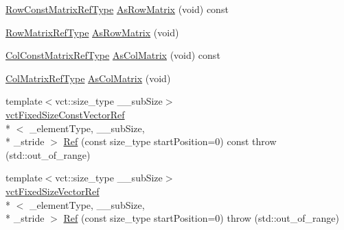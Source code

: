 {\bf }\par
\begin{DoxyCompactItemize}
\item 
\hyperlink{classvct_fixed_size_const_vector_base_ab7c118dbf79db9194157ced0e4549814}{Row\-Const\-Matrix\-Ref\-Type} \hyperlink{classvct_fixed_size_vector_base_a39464b3784e6b405902fd2a9fc76dbbb}{As\-Row\-Matrix} (void) const 
\item 
\hyperlink{classvct_fixed_size_const_vector_base_a1f9ff7c6b2b3f98c51d1bf3eefdfbd32}{Row\-Matrix\-Ref\-Type} \hyperlink{classvct_fixed_size_vector_base_af441b67e4a887c3d32b8ac4aa764a1e6}{As\-Row\-Matrix} (void)
\item 
\hyperlink{classvct_fixed_size_const_vector_base_a7dd213f3b90969b8c89fd0766cf0a70e}{Col\-Const\-Matrix\-Ref\-Type} \hyperlink{classvct_fixed_size_vector_base_a842cdbb74b86b72531a7e6e5f0975895}{As\-Col\-Matrix} (void) const 
\item 
\hyperlink{classvct_fixed_size_const_vector_base_ac2454662f16abd75fdef4ce8d2a00a48}{Col\-Matrix\-Ref\-Type} \hyperlink{classvct_fixed_size_vector_base_af2c14e75be2bc46e347937d21c6d8948}{As\-Col\-Matrix} (void)
\end{DoxyCompactItemize}

{\bf }\par
\begin{DoxyCompactItemize}
\item 
{\footnotesize template$<$vct\-::size\-\_\-type \-\_\-\-\_\-sub\-Size$>$ }\\\hyperlink{classvct_fixed_size_const_vector_ref}{vct\-Fixed\-Size\-Const\-Vector\-Ref}\\*
$<$ \-\_\-element\-Type, \-\_\-\-\_\-sub\-Size, \\*
\-\_\-stride $>$ \hyperlink{classvct_fixed_size_vector_base_af8ea9140418ad9beaa2bd6d56ed5fb92}{Ref} (const size\-\_\-type start\-Position=0) const   throw (std\-::out\-\_\-of\-\_\-range)
\item 
{\footnotesize template$<$vct\-::size\-\_\-type \-\_\-\-\_\-sub\-Size$>$ }\\\hyperlink{classvct_fixed_size_vector_ref}{vct\-Fixed\-Size\-Vector\-Ref}\\*
$<$ \-\_\-element\-Type, \-\_\-\-\_\-sub\-Size, \\*
\-\_\-stride $>$ \hyperlink{classvct_fixed_size_vector_base_a7d5f356e402339007201e8a557c91d8a}{Ref} (const size\-\_\-type start\-Position=0)  throw (std\-::out\-\_\-of\-\_\-range)
\end{DoxyCompactItemize}

